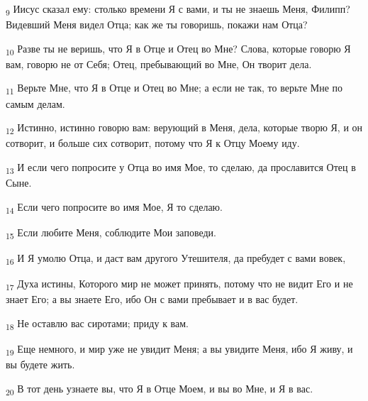 \begin{tcolorbox}
\textsubscript{9} Иисус сказал ему: столько времени Я с вами, и ты не знаешь Меня, Филипп? Видевший Меня видел Отца; как же ты говоришь, покажи нам Отца?
\end{tcolorbox}
\begin{tcolorbox}
\textsubscript{10} Разве ты не веришь, что Я в Отце и Отец во Мне? Слова, которые говорю Я вам, говорю не от Себя; Отец, пребывающий во Мне, Он творит дела.
\end{tcolorbox}
\begin{tcolorbox}
\textsubscript{11} Верьте Мне, что Я в Отце и Отец во Мне; а если не так, то верьте Мне по самым делам.
\end{tcolorbox}
\begin{tcolorbox}
\textsubscript{12} Истинно, истинно говорю вам: верующий в Меня, дела, которые творю Я, и он сотворит, и больше сих сотворит, потому что Я к Отцу Моему иду.
\end{tcolorbox}
\begin{tcolorbox}
\textsubscript{13} И если чего попросите у Отца во имя Мое, то сделаю, да прославится Отец в Сыне.
\end{tcolorbox}
\begin{tcolorbox}
\textsubscript{14} Если чего попросите во имя Мое, Я то сделаю.
\end{tcolorbox}
\begin{tcolorbox}
\textsubscript{15} Если любите Меня, соблюдите Мои заповеди.
\end{tcolorbox}
\begin{tcolorbox}
\textsubscript{16} И Я умолю Отца, и даст вам другого Утешителя, да пребудет с вами вовек,
\end{tcolorbox}
\begin{tcolorbox}
\textsubscript{17} Духа истины, Которого мир не может принять, потому что не видит Его и не знает Его; а вы знаете Его, ибо Он с вами пребывает и в вас будет.
\end{tcolorbox}
\begin{tcolorbox}
\textsubscript{18} Не оставлю вас сиротами; приду к вам.
\end{tcolorbox}
\begin{tcolorbox}
\textsubscript{19} Еще немного, и мир уже не увидит Меня; а вы увидите Меня, ибо Я живу, и вы будете жить.
\end{tcolorbox}
\begin{tcolorbox}
\textsubscript{20} В тот день узнаете вы, что Я в Отце Моем, и вы во Мне, и Я в вас.
\end{tcolorbox}
